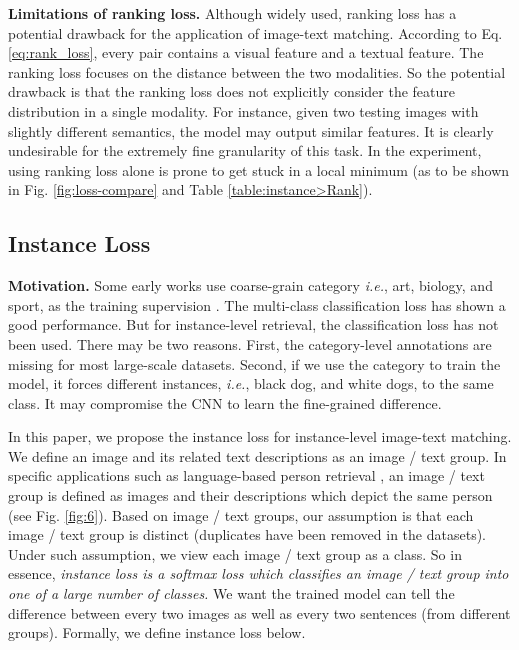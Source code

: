 \documentclass[10pt,final,journal]{IEEEtran}
\newcommand{\ie}{\mbox{\emph{i.e.}}}
\begin{document}
\textbf{Limitations of ranking loss.} Although widely used, ranking loss has a potential drawback for the application of image-text matching. According to Eq. \ref{eq:rank_loss}, every pair contains a visual feature and a textual feature. The ranking loss focuses on the distance between the two modalities. So the potential drawback is that the ranking loss does not explicitly consider the feature distribution in a single modality. For instance, given two testing images with slightly different semantics, the model may output similar features. It is clearly undesirable for the extremely fine granularity of this task. 
In the experiment, using ranking loss alone is prone to get stuck in a local minimum (as to be shown in Fig. \ref{fig:loss-compare} and Table \ref{table:instance>Rank}).

\subsection{Instance Loss} \label{sec:instance}


\textbf{Motivation.}
Some early works use coarse-grain category \ie, art, biology, and sport, as the training supervision \cite{sharma2012generalized,wang2013learning,wei2017cross}. The multi-class classification loss has shown a good performance. But for instance-level retrieval, the classification loss has not been used. There may be two reasons. First, the category-level annotations are missing for most large-scale datasets. Second, if we use the category to train the model, it forces different instances, \ie, black dog, and white dogs, to the same class. It may compromise the CNN to learn the fine-grained difference. 

In this paper, we propose the instance loss for instance-level image-text matching. We define an image and its related text descriptions as an image / text group. In specific applications such as language-based person retrieval \cite{li2017identity,li2017person}, an image / text group is defined as images and their descriptions which depict the same person (see Fig. \ref{fig:6}). Based on image / text groups, our assumption is that each image / text group is distinct (duplicates have been removed in the datasets). Under such assumption, we view each image / text group as a class. So in essence, \emph{instance loss is a softmax loss which classifies an image / text group into one of a large number of classes.} We want the trained model can tell the difference between every two images as well as every two sentences (from different groups). Formally, we define instance loss below.
\end{document}
